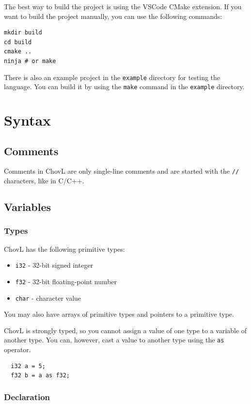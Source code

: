 The best way to build the project is using the VSCode CMake extension.
If you want to build the project manually, you can use the following commands:
\begin{verbatim}
mkdir build
cd build
cmake ..
ninja # or make
\end{verbatim}

There is also an example project in the \texttt{example} directory for testing the language. You can build it by using the \texttt{make} command in the \texttt{example} directory.

\section{Syntax}
\subsection{Comments}
Comments in ChovL are only single-line comments and are started with the \texttt{//} characters, like in C/C++.

\subsection{Variables}

\subsubsection{Types}

ChovL has the following primitive types:
\begin{itemize}
  \item \texttt{i32} - 32-bit signed integer
  \item \texttt{f32} - 32-bit floating-point number
  \item \texttt{char} - character value
\end{itemize}

You may also have arrays of primitive types and pointers to a primitive type.

ChovL is strongly typed, so you cannot assign a value of one type to a variable of another type. You can, however, cast a value to another type using the \texttt{as} operator.
\begin{verbatim}
  i32 a = 5;
  f32 b = a as f32;
\end{verbatim}

\subsubsection{Declaration}

